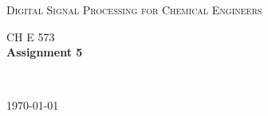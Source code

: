 \begin{titlepage}

\begin{center}


\begin{spacing}{2}
\textsc{\LARGE Digital Signal Processing for Chemical Engineers}\\[1.5cm]
\end{spacing}


\textsc{\Large CH E 573}\\[1.5cm]


{ \huge \bfseries Assignment 5}\\[1.5cm]


\begin{minipage}{0.4\textwidth}
\large
{} \\
\end{minipage}


\vfill

{\large \today}

\end{center}

\end{titlepage}